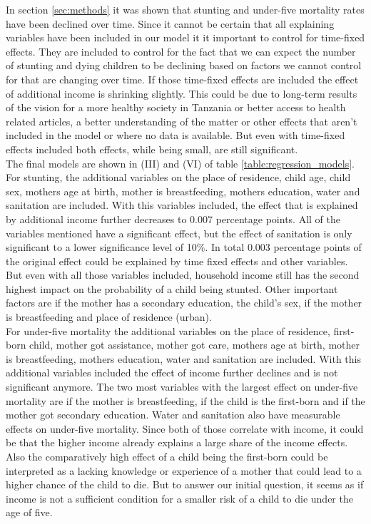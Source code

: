 \documentclass[a4paper, 11pt]{article} %
\begin{document}
In section \ref{sec:methods} it was shown that stunting and under-five mortality rates have been declined over time. Since it cannot be certain that all explaining variables have been included in our model it it important to control for time-fixed effects. They are included to control for the fact that we can expect the number of stunting and dying children to be declining based on factors we cannot control for that are changing over time. If those time-fixed effects are included the effect of additional income is shrinking slightly. This could be due to long-term results of the vision for a more healthy society in Tanzania or better access to health related articles, a better understanding of the matter or other effects that aren't included in the model or where no data is available. But even with time-fixed effects included both effects, while being small, are still significant. \\

The final models are shown in (III) and (VI) of table \ref{table:regression_models}. For stunting, the additional variables on the place of residence, child age, child sex, mothers age at birth, mother is breastfeeding, mothers education, water and sanitation are included. With this variables included, the effect that is explained by additional income further decreases to 0.007 percentage points. All of the variables mentioned have a significant effect, but the effect of sanitation is only significant to a lower significance level of 10\%. In total 0.003 percentage points of the original effect could be explained by time fixed effects and other variables. But even with all those variables included, household income still has the second highest impact on the probability of a child being stunted. Other important factors are if the mother has a secondary education, the child's sex, if the mother is breastfeeding and place of residence (urban).  \\

For under-five mortality the additional variables on the place of residence, first-born child, mother got assistance, mother got care, mothers age at birth, mother is breastfeeding, mothers education, water and sanitation are included. With this additional variables included the effect of income further declines and is not significant anymore. The two most variables with the largest effect on under-five mortality are if the mother is breastfeeding, if the child is the first-born and if the mother got secondary education. Water and sanitation also have measurable effects on under-five mortality. Since both of those correlate with income, it could be that the higher income already explains a large share of the income effects. Also the comparatively high effect of a child being the first-born could be interpreted as a lacking knowledge or experience of a mother that could lead to a higher chance of the child to die. But to answer our initial question, it seems as if income is not a sufficient condition for a smaller risk of a child to die under the age of five. \\
\end{document}
